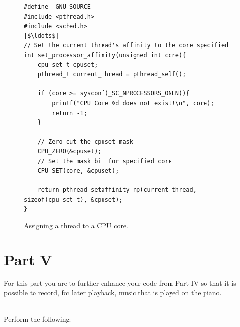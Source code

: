 \documentclass[epsfig,10pt,fullpage]{article}
\begin{document}
\lstset{language=C,numbers=none,escapechar=|}
\begin{figure}[H]
\begin{center}
\begin{minipage}[t]{14.75 cm}
\begin{lstlisting}
#define _GNU_SOURCE 
#include <pthread.h>
#include <sched.h>
|$\ldots$|
// Set the current thread's affinity to the core specified
int set_processor_affinity(unsigned int core){
	cpu_set_t cpuset;
	pthread_t current_thread = pthread_self(); 
    
	if (core >= sysconf(_SC_NPROCESSORS_ONLN)){
		printf("CPU Core %d does not exist!\n", core);
		return -1;
	}
    
	// Zero out the cpuset mask
	CPU_ZERO(&cpuset);
	// Set the mask bit for specified core
	CPU_SET(core, &cpuset);
    
	return pthread_setaffinity_np(current_thread, sizeof(cpu_set_t), &cpuset); 
}

\end{lstlisting}
\end{minipage}
\end{center}
\vspace{-0.33in}\caption{Assigning a thread to a CPU core.}
\label{fig:cpucore}
\end{figure}

\noindent
\section*{Part V}

\noindent
For this part you are to further enhance your code from Part IV so that it is possible to
record, for later playback, music that is played on the piano.

~\\
\noindent
Perform the following:
\end{document}
